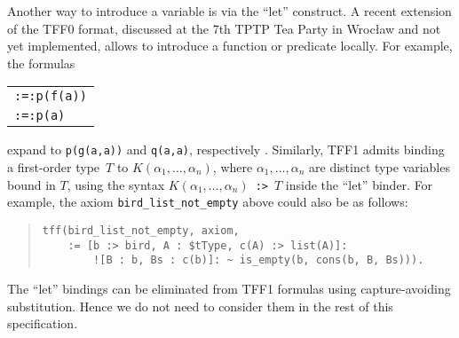 Another way to introduce a variable is via the ``let'' construct.
A recent extension of the TFF0 format, discussed at the 7th TPTP Tea Party in
Wrocław and not yet implemented, allows to introduce a function or predicate
locally. For example, the formulas
\begin{center}
\begin{tabular}{l}
{\tt :=\;[X\;:\;\$int,\;f(X)\;=\;g(X,\;X)]:\;p(f(a))} \\[\smallskipamount]
{\tt :=\;[X\;:\;\$int,\;p(X)\;<=>\;q(X,\;X)]:\;p(a)}
\end{tabular}
\end{center}
expand to {\tt p(g(a,\;a))} and {\tt q(a,\;a)}, respectively
\cite{geoff-tptptp-notes}.
Similarly, TFF1 admits binding a first-order type~$T$ to $K(\alpha_1, \ldots,
\alpha_n)$, where $\alpha_1, \ldots, \alpha_n$ are distinct type variables bound
in $T$, using the syntax $K(\alpha_1, \ldots, \alpha_n)$~{\tt :>}~$T$ inside
the ``let'' binder.
%
%
%
For example, the axiom \verb+bird_list_not_empty+ above could also be as
follows:
\begin{quote}
\begin{verbatim}
tff(bird_list_not_empty, axiom,
    := [b :> bird, A : $tType, c(A) :> list(A)]:
        ![B : b, Bs : c(b)]: ~ is_empty(b, cons(b, B, Bs))).
\end{verbatim}
\end{quote}
%
The ``let'' bindings can be eliminated from TFF1 formulas using capture-avoiding
substitution. Hence we do not need to consider them in the rest of this
specification.

